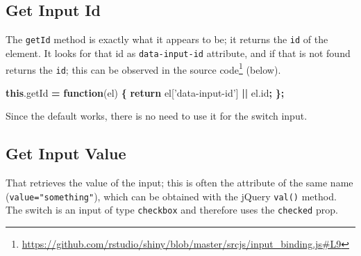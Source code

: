 \documentclass[10pt,]{krantz}
\makeatletter
\newenvironment{Shaded}{\begin{snugshade}}{\end{snugshade}}
\newcommand{\AttributeTok}[1]{\textcolor[rgb]{0.61,0.61,0.61}{#1}}
\newcommand{\CommentTok}[1]{\textcolor[rgb]{0.37,0.37,0.37}{\textit{#1}}}
\newcommand{\ControlFlowTok}[1]{\textcolor[rgb]{0.27,0.27,0.27}{\textbf{#1}}}
\newcommand{\DataTypeTok}[1]{\textcolor[rgb]{0.27,0.27,0.27}{#1}}
\newcommand{\KeywordTok}[1]{\textcolor[rgb]{0.27,0.27,0.27}{\textbf{#1}}}
\newcommand{\NormalTok}[1]{#1}
\newcommand{\OperatorTok}[1]{\textcolor[rgb]{0.43,0.43,0.43}{\textbf{#1}}}
\newcommand{\StringTok}[1]{\textcolor[rgb]{0.5,0.5,0.5}{#1}}
\newcommand{\VariableTok}[1]{\textcolor[rgb]{0,0,0}{#1}}
\renewcommand{\href}[2]{#2\footnote{\url{#1}}}
\newenvironment{kframe}{%
\medskip{}
\setlength{\fboxsep}{.8em}
 \def\at@end@of@kframe{}%
 \ifinner\ifhmode%
  \def\at@end@of@kframe{\end{minipage}}%
  \begin{minipage}{\columnwidth}%
 \fi\fi%
 \def\FrameCommand##1{\hskip\@totalleftmargin \hskip-\fboxsep
 \colorbox{shadecolor}{##1}\hskip-\fboxsep
     \hskip-\linewidth \hskip-\@totalleftmargin \hskip\columnwidth}%
 \MakeFramed {\advance\hsize-\width
   \@totalleftmargin\z@ \linewidth\hsize
   \@setminipage}}%
 {\par\unskip\endMakeFramed%
 \at@end@of@kframe}
\renewenvironment{Shaded}{\begin{kframe}}{\end{kframe}}
\makeatother
\begin{document}
\hypertarget{shiny-input-get-id}{%
\subsection{Get Input Id}\label{shiny-input-get-id}}

The \texttt{getId} method is exactly what it appears to be; it returns the \texttt{id} of the element. It looks for that id as \texttt{data-input-id} attribute, and if that is not found returns the \texttt{id}; this can be observed in the \href{https://github.com/rstudio/shiny/blob/master/srcjs/input_binding.js\#L9}{source code} (below).

\begin{Shaded}
\begin{Highlighting}[]
\KeywordTok{this}\NormalTok{.}\AttributeTok{getId} \OperatorTok{=} \KeywordTok{function}\NormalTok{(el) }\OperatorTok{\{}
  \ControlFlowTok{return}\NormalTok{ el[}\StringTok{'data-input-id'}\NormalTok{] }\OperatorTok{||} \VariableTok{el}\NormalTok{.}\AttributeTok{id}\OperatorTok{;}
\OperatorTok{\};}
\end{Highlighting}
\end{Shaded}

Since the default works, there is no need to use it for the switch input.

\hypertarget{shiny-input-get-value}{%
\subsection{Get Input Value}\label{shiny-input-get-value}}

That retrieves the value of the input; this is often the attribute of the same name (\texttt{value="something"}), which can be obtained with the jQuery \texttt{val()} method. The switch is an input of type \texttt{checkbox} and therefore uses the \texttt{checked} prop.

\begin{Shaded}
\end{Shaded}
\end{document}
